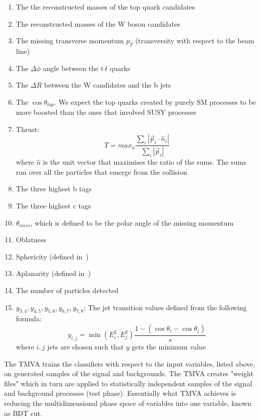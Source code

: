 \documentclass[12pt,a4paper]{report}
\begin{document}
\begin{enumerate}
 \item The the reconstructed masses of the top quark candidates
 \item The reconstructed masses of the W boson candidates
 \item The missing transverse momentum  $p_{T}$ (transversity with respect to the beam line)
 \item The $\Delta \phi$ angle between the $t\bar{}t$ quarks
 \item The $\Delta R$  between the W candidates and the b jets
 \item The $\cos\theta_{top}$. We expect the top quarks created by purely SM processes to be more boosted 
 than the ones that involved SUSY processes
 \item Thrust: 
 \begin{equation}
  T=max_{\hat{n}}\frac{\sum_{i}^{}|\vec{p}_{i}\cdot \hat{n}_{i}|}{\sum_{i}^{}|\vec{p}_{i}|}
 \end{equation}
	where $\hat{n}$ is the unit vector that maximises the ratio of the sums. The sums run over all the
	particles that emerge from the collision

	
  \item The three highest b tags
  \item The three highest c tags
  \item $\theta_{miss}$, which is defined to be the polar angle of the missing momentum
  \item Oblatness
  \item Sphericity (defined in~\cite{chen2012new})
  \item Aplanarity (defined in~\cite{chen2012new})
  \item The number of particles detected
  \item $y_{3,4},y_{4,5},y_{5,6},y_{6,7},y_{7,8}$: The jet transition values defined from the following 
  formula:
  \begin{equation}
   y_{i,j}=\min(E_{i}^{2},E_{j}^{2})\frac{1-(\cos\theta_{i}-\cos\theta_{j})}{s}
  \end{equation}
  where $i,j$ jets are chosen such that $y$ gets the minimum value 
\end{enumerate}  

\newpage

The TMVA trains the classifiers with respect to the input variables, listed above, 
on generated samples of the signal and backgrounds. The TMVA creates "weight files" which in turn are 
applied to statistically independent samples of the signal and background processes (test phase). 
Essentially what TMVA achieves is reducing the 
multidimensional phase space of variables into one variable, known as BDT cut.
\end{document}
